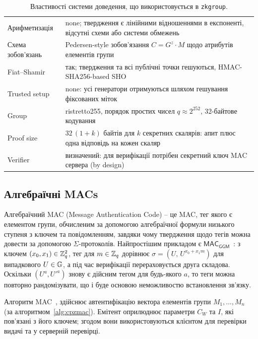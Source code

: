 \begin{table}[!ht]
  \centering
  \small
  \begin{tabularx}{\linewidth}{@{}l X@{}}
    \toprule
    Арифметизація     & none; твердження є лінійними відношеннями в експоненті, відсутні схеми або системи обмежень \\
    Схема зобов'язань & Pedersen-style зобов'язання $C = G^{z}\cdot M$ щодо атрибутів елементів групи               \\
    Fiat--Shamir      & так; твердження та всі публічні точки гешуються, HMAC-SHA256-based SHO    \\
    Trusted setup     & none: усі генератори отримуються шляхом гешування фіксованих міток                          \\
    Group             & ristretto255, порядок простих чисел $q\approx 2^{252}$, 32-байтове кодування~\cite{RFC9496} \\
    Proof size        & $32\,(1+k)$ байтів для $k$ секретних скалярів: апит плюс одна відповідь на кожен скаляр     \\
    Verifier          & визначений: для верифікації потрібен секретний ключ MAC сервера (by design)                 \\
    \bottomrule
  \end{tabularx}
  \caption{Властивості системи доведення, що використовується в \texttt{zkgroup}.}
  \label{tab:properties}
\end{table}

\subsection{Алгебраїчні MACs}
Алгебраїчний MAC (Message Authentication Code) -- це MAC, тег якого є елементом групи, обчисленим за допомогою 
алгебраїчної формули низького ступеня з ключем та повідомленням, завдяки чому твердження щодо тегів можна довести 
за допомогою $\Sigma$-протоколів. Найпростішим прикладом є $\mathsf{MAC}_{\mathsf{GGM}}$~\cite{CMZ14}: з ключем 
$(x_0,x_1) \in \mathbb{Z}_q^2$, тег для $m\in\mathbb{Z}_q$ дорівнює $\sigma=(U,\,U^{x_0+x_1 m})$ для випадкового $U \in \mathbb{G}$, а під 
час верифікації перераховується друга складова. Оскільки $(U^a, U'^a)$ знову є дійсним тегом для будь-якого $a$, 
то теги можна повторно рандомізувати, що і буде основою неможливостю встановлення зв'язку.

Алгоритм MAC~\cite{CPZ20}, здійснює автентифікацію вектора елементів групи $M_1, \dots, M_n$ (за алгоритмом~\ref{alg:cpzmac}). 
Емітент оприлюднює параметри $C_W$ та $I$, які пов'язані з його ключем; згодом вони використовуються клієнтом для 
перевірки видачі та у серверній перевірці.

